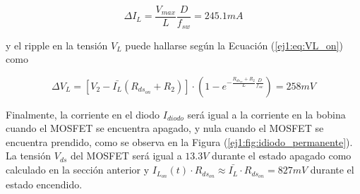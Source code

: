 \begin{equation}
\Delta I_L = \frac{V_{max}}{L}\frac{D}{f_{sw}} = 245.1mA
\end{equation}

y el ripple en la tensión $V_L$ puede hallarse según la Ecuación (\ref{ej1:eq:VL_on}) como

\begin{equation}
\Delta V_L = \left[ V_2 - \bar{I_L} (R_{ds_{on}}+R_2) \right] \cdot (1-e^{-\frac{R_{ds_{on}} + R_2}{L}\frac{D}{f_{sw}}}) = 258mV
\end{equation}

Finalmente, la corriente en el diodo $I_{diodo}$ será igual a la corriente en la bobina cuando el MOSFET se encuentra apagado, y nula cuando el MOSFET se encuentra prendido, como se observa en la Figura (\ref{ej1:fig:idiodo_permanente}). La tensión $V_{ds}$ del MOSFET será igual a $13.3V$ durante el estado apagado como calculado en la sección anterior y $I_{L_{on}}(t) \cdot R_{ds_{on}} \approx \bar{I_L} \cdot R_{ds_{on}} = 827mV$ durante el estado encendido.

